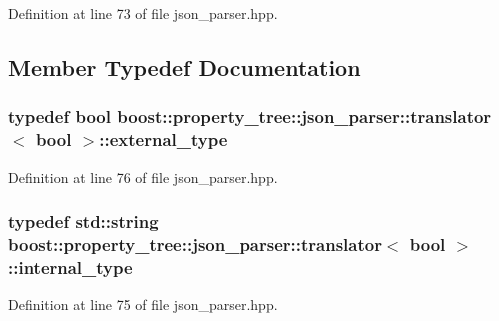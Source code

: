 Definition at line 73 of file json\+\_\+parser.\+hpp.



\subsection{Member Typedef Documentation}
\subsubsection[{\texorpdfstring{external\+\_\+type}{external_type}}]{\setlength{\rightskip}{0pt plus 5cm}typedef bool {\bf boost\+::property\+\_\+tree\+::json\+\_\+parser\+::translator}$<$ bool $>$\+::{\bf external\+\_\+type}}\hypertarget{structboost_1_1property__tree_1_1json__parser_1_1translator_3_01bool_01_4_a735dcf537d03fd03712c193e56de30bc}{}\label{structboost_1_1property__tree_1_1json__parser_1_1translator_3_01bool_01_4_a735dcf537d03fd03712c193e56de30bc}


Definition at line 76 of file json\+\_\+parser.\+hpp.

\subsubsection[{\texorpdfstring{internal\+\_\+type}{internal_type}}]{\setlength{\rightskip}{0pt plus 5cm}typedef std\+::string {\bf boost\+::property\+\_\+tree\+::json\+\_\+parser\+::translator}$<$ bool $>$\+::{\bf internal\+\_\+type}}\hypertarget{structboost_1_1property__tree_1_1json__parser_1_1translator_3_01bool_01_4_afb06d7dd56a70ab4a34df47427f9498d}{}\label{structboost_1_1property__tree_1_1json__parser_1_1translator_3_01bool_01_4_afb06d7dd56a70ab4a34df47427f9498d}


Definition at line 75 of file json\+\_\+parser.\+hpp.




